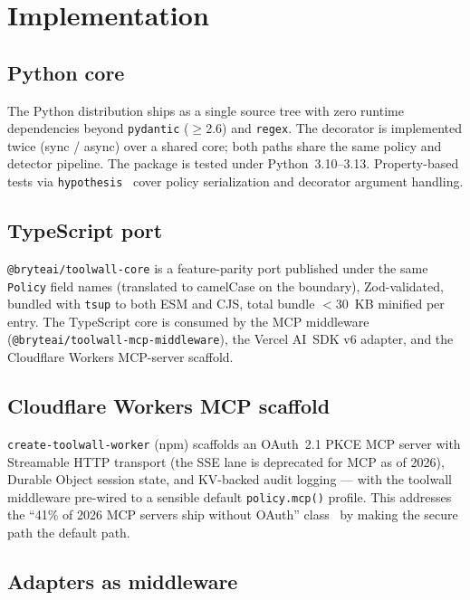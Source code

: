 \section{Implementation}
\label{sec:impl}

\subsection{Python core}

The Python distribution ships as a single source tree with zero
runtime dependencies beyond \verb|pydantic| ($\ge$2.6) and
\verb|regex|. The decorator is implemented twice
(sync / async) over a shared core; both paths share the same
policy and detector pipeline. The package is tested under
Python~3.10--3.13. Property-based tests via
\verb|hypothesis|~\cite{hypothesis} cover policy serialization
and decorator argument handling.

\subsection{TypeScript port}

\verb|@bryteai/toolwall-core| is a feature-parity port published
under the same \verb|Policy| field names (translated to camelCase
on the boundary), Zod-validated, bundled with \verb|tsup| to
both ESM and CJS, total bundle $<$30~KB minified per entry. The
TypeScript core is consumed by the MCP middleware
(\verb|@bryteai/toolwall-mcp-middleware|), the Vercel AI~SDK v6
adapter, and the Cloudflare Workers MCP-server scaffold.

\subsection{Cloudflare Workers MCP scaffold}

\verb|create-toolwall-worker| (npm) scaffolds an OAuth~2.1 PKCE
MCP server with Streamable HTTP transport (the SSE lane is
deprecated for MCP as of 2026), Durable Object session state,
and KV-backed audit logging --- with the toolwall middleware
pre-wired to a sensible default \verb|policy.mcp()| profile. This
addresses the ``41\% of 2026 MCP servers ship without OAuth''
class~\cite{salt2026mcp} by making the secure path the default
path.

\subsection{Adapters as middleware}

